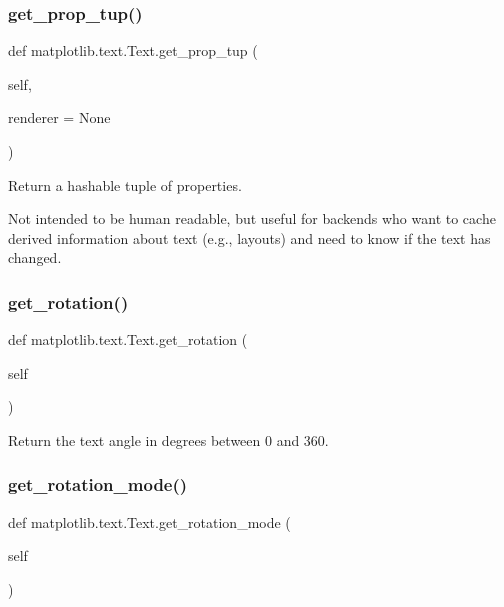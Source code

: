 \subsubsection{\texorpdfstring{get\+\_\+prop\+\_\+tup()}{get\_prop\_tup()}}
{\footnotesize\ttfamily def matplotlib.\+text.\+Text.\+get\+\_\+prop\+\_\+tup (\begin{DoxyParamCaption}\item[{}]{self,  }\item[{}]{renderer = {\ttfamily None} }\end{DoxyParamCaption})}

\begin{DoxyVerb}Return a hashable tuple of properties.

Not intended to be human readable, but useful for backends who
want to cache derived information about text (e.g., layouts) and
need to know if the text has changed.
\end{DoxyVerb}
 \mbox{\label{classmatplotlib_1_1text_1_1Text_a816b4d8bdeaa871274f82257f83e6dff}} 
\subsubsection{\texorpdfstring{get\+\_\+rotation()}{get\_rotation()}}
{\footnotesize\ttfamily def matplotlib.\+text.\+Text.\+get\+\_\+rotation (\begin{DoxyParamCaption}\item[{}]{self }\end{DoxyParamCaption})}

\begin{DoxyVerb}Return the text angle in degrees between 0 and 360.\end{DoxyVerb}
 \mbox{\label{classmatplotlib_1_1text_1_1Text_a96b57cf80cb639db7399752d21a368df}} 
\subsubsection{\texorpdfstring{get\+\_\+rotation\+\_\+mode()}{get\_rotation\_mode()}}
{\footnotesize\ttfamily def matplotlib.\+text.\+Text.\+get\+\_\+rotation\+\_\+mode (\begin{DoxyParamCaption}\item[{}]{self }\end{DoxyParamCaption})}

